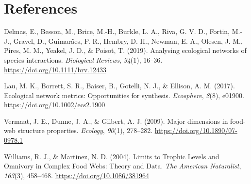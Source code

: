 \documentclass[
]{article}
\newlength{\cslhangindent}
\newenvironment{CSLReferences}[2] %
 {\begin{list}{}{%
  \setlength{\itemindent}{0pt}
  \setlength{\leftmargin}{0pt}
  \setlength{\parsep}{0pt}
  \ifodd #1
   \setlength{\leftmargin}{\cslhangindent}
   \setlength{\itemindent}{-1\cslhangindent}
  \fi
  \setlength{\itemsep}{#2\baselineskip}}}
 {\end{list}}
\begin{document}
\section*{References}\label{references}

\label{refs}
\begin{CSLReferences}{1}{0}
Delmas, E., Besson, M., Brice, M.-H., Burkle, L. A., Riva, G. V. D.,
Fortin, M.-J., Gravel, D., Guimarães, P. R., Hembry, D. H., Newman, E.
A., Olesen, J. M., Pires, M. M., Yeakel, J. D., \& Poisot, T. (2019).
Analysing ecological networks of species interactions. \emph{Biological
Reviews}, \emph{94}(1), 16--36. \url{https://doi.org/10.1111/brv.12433}

Lau, M. K., Borrett, S. R., Baiser, B., Gotelli, N. J., \& Ellison, A.
M. (2017). Ecological network metrics: Opportunities for synthesis.
\emph{Ecosphere}, \emph{8}(8), e01900.
\url{https://doi.org/10.1002/ecs2.1900}

Vermaat, J. E., Dunne, J. A., \& Gilbert, A. J. (2009). Major dimensions
in food-web structure properties. \emph{Ecology}, \emph{90}(1),
278--282. \url{https://doi.org/10.1890/07-0978.1}

Williams, R. J., \& Martinez, N. D. (2004). Limits to {Trophic Levels}
and {Omnivory} in {Complex Food Webs}: {Theory} and {Data}. \emph{The
American Naturalist}, \emph{163}(3), 458--468.
\url{https://doi.org/10.1086/381964}

\end{CSLReferences}
\end{document}
